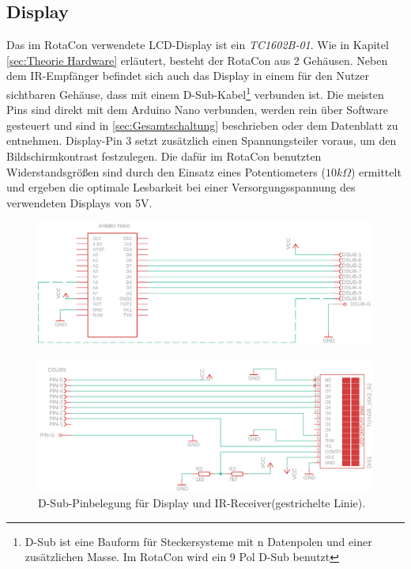 \documentclass[11pt, titlepage]{report}
\begin{document}
			\subsection{Display}
			\label{sec:Display}
				Das im RotaCon verwendete LCD-Display ist ein \textit{TC1602B-01}. Wie in Kapitel \ref{sec:Theorie Hardware} erläutert, besteht der RotaCon aus 2 Gehäusen. Neben dem IR-Empfänger befindet sich auch das Display in einem für den Nutzer sichtbaren Gehäuse, dass mit einem D-Sub-Kabel\footnote{D-Sub ist eine Bauform für Steckersysteme mit n Datenpolen und einer zusätzlichen Masse. Im RotaCon wird ein 9 Pol D-Sub benutzt} verbunden ist. Die meisten Pins sind direkt mit dem Arduino Nano verbunden, werden rein über Software gesteuert und sind in \ref{sec:Gesamtschaltung} beschrieben oder dem Datenblatt zu entnehmen. Display-Pin 3 setzt zusätzlich einen Spannungsteiler voraus, um den Bildschirmkontrast festzulegen. Die dafür im RotaCon benutzten Widerstandsgrößen sind durch den Einsatz eines Potentiometers ($10k\Omega$) ermittelt und ergeben die optimale Lesbarkeit bei einer Versorgungsspannung des verwendeten Displays von 5V.
				\begin{figure}[htbp]
					\includegraphics[width=\linewidth]{./img/dsub2.png}
					\label{fig:imgDisplay}
				\end{figure}
				\begin{figure}[htbp]
					\includegraphics[width=\linewidth]{./img/display2.png}
					\caption{D-Sub-Pinbelegung für Display und IR-Receiver(gestrichelte Linie).
					\label{fig:imgDSUB}}
				\end{figure}
\end{document}
